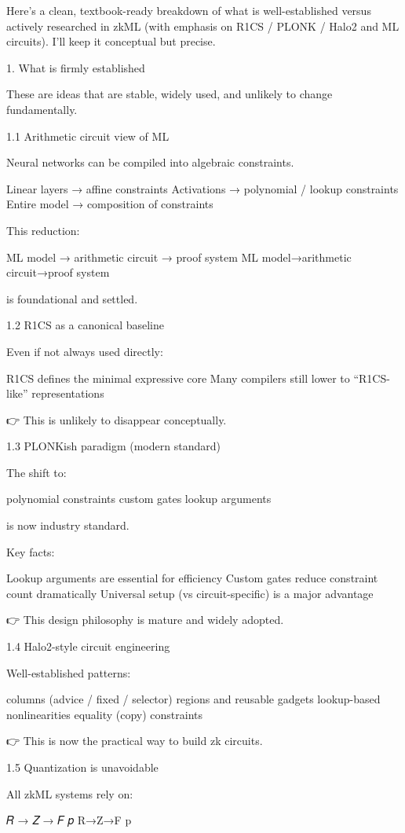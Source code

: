 Here’s a clean, textbook-ready breakdown of what is well-established versus actively researched in zkML (with emphasis on R1CS / PLONK / Halo2 and ML circuits). I’ll keep it conceptual but precise.

1. What is firmly established

These are ideas that are stable, widely used, and unlikely to change fundamentally.

1.1 Arithmetic circuit view of ML

Neural networks can be compiled into algebraic constraints.

Linear layers → affine constraints
Activations → polynomial / lookup constraints
Entire model → composition of constraints

This reduction:

ML model
→
arithmetic circuit
→
proof system
ML model→arithmetic circuit→proof system

is foundational and settled.

1.2 R1CS as a canonical baseline

Even if not always used directly:

R1CS defines the minimal expressive core
Many compilers still lower to “R1CS-like” representations

👉 This is unlikely to disappear conceptually.

1.3 PLONKish paradigm (modern standard)

The shift to:

polynomial constraints
custom gates
lookup arguments

is now industry standard.

Key facts:

Lookup arguments are essential for efficiency
Custom gates reduce constraint count dramatically
Universal setup (vs circuit-specific) is a major advantage

👉 This design philosophy is mature and widely adopted.

1.4 Halo2-style circuit engineering

Well-established patterns:

columns (advice / fixed / selector)
regions and reusable gadgets
lookup-based nonlinearities
equality (copy) constraints

👉 This is now the practical way to build zk circuits.

1.5 Quantization is unavoidable

All zkML systems rely on:

𝑅
→
𝑍
→
𝐹
𝑝
R→Z→F
p
	​

